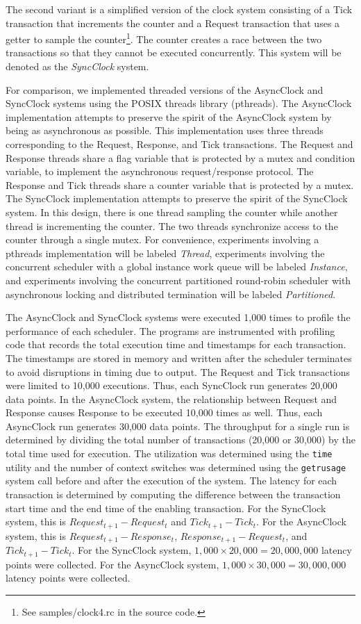 The second variant is a simplified version of the clock system consisting of a Tick transaction that increments the counter and a Request transaction that uses a getter to sample the counter\footnote{See samples/clock4.rc in the source code.}.
The counter creates a race between the two transactions so that they cannot be executed concurrently.
This system will be denoted as the \emph{SyncClock} system.

For comparison, we implemented threaded versions of the AsyncClock and SyncClock systems using the POSIX threads library (pthreads).
The AsyncClock implementation attempts to preserve the spirit of the AsyncClock system by being as asynchronous as possible.
This implementation uses three threads corresponding to the Request, Response, and Tick transactions.
The Request and Response threads share a flag variable that is protected by a mutex and condition variable, to implement the asynchronous request/response protocol.
The Response and Tick threads share a counter variable that is protected by a mutex.
The SyncClock implementation attempts to preserve the spirit of the SyncClock system.
In this design, there is one thread sampling the counter while another thread is incrementing the counter.
The two threads synchronize access to the counter through a single mutex.
For convenience, experiments involving a pthreads implementation will be labeled \emph{Thread}, experiments involving the concurrent scheduler with a global instance work queue will be labeled \emph{Instance}, and experiments involving the concurrent partitioned  round-robin scheduler with asynchronous locking and distributed termination will be labeled \emph{Partitioned}.

The AsyncClock and SyncClock systems were executed 1,000 times to profile the performance of each scheduler.
The programs are instrumented with profiling code that records the total execution time and timestamps for each transaction.
The timestamps are stored in memory and written after the scheduler terminates to avoid disruptions in timing due to output.
The Request and Tick transactions were limited to 10,000 executions.
Thus, each SyncClock run generates 20,000 data points.
In the AsyncClock system, the relationship between Request and Response causes Response to be executed 10,000 times as well.
Thus, each AsyncClock run generates 30,000 data points.
The throughput for a single run is determined by dividing the total number of transactions (20,000 or 30,000) by the total time used for execution.
The utilization was determined using the \verb+time+ utility and the number of context switches was determined using the \verb+getrusage+ system call before and after the execution of the system.
The latency for each transaction is determined by computing the difference between the transaction start time and the end time of the enabling transaction.
For the SyncClock system, this is $Request_{t+1} - Request_{t}$ and $Tick_{t+1} - Tick_{t}$.
For the AsyncClock system, this is $Request_{t+1} - Response_{t}$, $Response_{t+1} - Request_{t}$, and $Tick_{t+1} - Tick_{t}$.
For the SyncClock system, $1,000 \times 20,000 = 20,000,000$ latency points were collected.
For the AsyncClock system, $1,000 \times 30,000 = 30,000,000$ latency points were collected.

